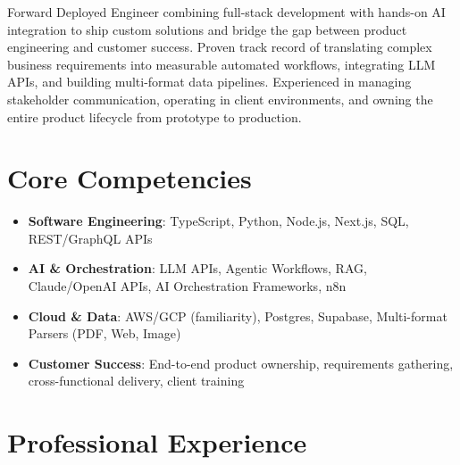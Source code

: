 \documentclass[11pt,a4paper,sans]{moderncv}
\begin{document}
\makecvtitle

Forward Deployed Engineer combining full-stack development with hands-on AI integration to ship custom solutions and bridge the gap between product engineering and customer success. Proven track record of translating complex business requirements into measurable automated workflows, integrating LLM APIs, and building multi-format data pipelines. Experienced in managing stakeholder communication, operating in client environments, and owning the entire product lifecycle from prototype to production.

\vspace{3pt}
\section{Core Competencies}
\begin{itemize}
\item \textbf{Software Engineering}: TypeScript, Python, Node.js, Next.js, SQL, REST/GraphQL APIs
\item \textbf{AI \& Orchestration}: LLM APIs, Agentic Workflows, RAG, Claude/OpenAI APIs, AI Orchestration Frameworks, n8n
\item \textbf{Cloud \& Data}: AWS/GCP (familiarity), Postgres, Supabase, Multi-format Parsers (PDF, Web, Image)
\item \textbf{Customer Success}: End-to-end product ownership, requirements gathering, cross-functional delivery, client training
\end{itemize}

\section{Professional Experience}
\end{document}
